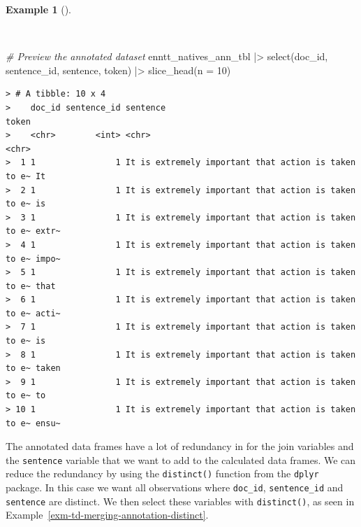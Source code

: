 \documentclass[
  letterpaper,
]{latex/krantz}
\newenvironment{Shaded}{\begin{snugshade}}{\end{snugshade}}
\newcommand{\AttributeTok}[1]{\textcolor[rgb]{0.00,0.00,0.00}{#1}}
\newcommand{\CommentTok}[1]{\textcolor[rgb]{0.00,0.00,0.00}{\textit{#1}}}
\newcommand{\DecValTok}[1]{\textcolor[rgb]{0.00,0.00,0.00}{#1}}
\newcommand{\FunctionTok}[1]{\textcolor[rgb]{0.00,0.00,0.00}{#1}}
\newcommand{\NormalTok}[1]{\textcolor[rgb]{0.00,0.00,0.00}{#1}}
\newcommand{\SpecialCharTok}[1]{\textcolor[rgb]{0.00,0.00,0.00}{#1}}
\theoremstyle{definition}
\newtheorem{example}{Example}[chapter]
\theoremstyle{remark}
\begin{document}
\begin{example}[]\protect\hypertarget{exm-td-merging-join-prepped-syn-comp-ann}{}\label{exm-td-merging-join-prepped-syn-comp-ann}

~

\begin{Shaded}
\begin{Highlighting}[]
\CommentTok{\# Preview the annotated dataset}
\NormalTok{enntt\_natives\_ann\_tbl }\SpecialCharTok{|\textgreater{}}
  \FunctionTok{select}\NormalTok{(doc\_id, sentence\_id, sentence, token) }\SpecialCharTok{|\textgreater{}}
  \FunctionTok{slice\_head}\NormalTok{(}\AttributeTok{n =} \DecValTok{10}\NormalTok{)}
\end{Highlighting}
\end{Shaded}

\begin{verbatim}
> # A tibble: 10 x 4
>    doc_id sentence_id sentence                                             token
>    <chr>        <int> <chr>                                                <chr>
>  1 1                1 It is extremely important that action is taken to e~ It   
>  2 1                1 It is extremely important that action is taken to e~ is   
>  3 1                1 It is extremely important that action is taken to e~ extr~
>  4 1                1 It is extremely important that action is taken to e~ impo~
>  5 1                1 It is extremely important that action is taken to e~ that 
>  6 1                1 It is extremely important that action is taken to e~ acti~
>  7 1                1 It is extremely important that action is taken to e~ is   
>  8 1                1 It is extremely important that action is taken to e~ taken
>  9 1                1 It is extremely important that action is taken to e~ to   
> 10 1                1 It is extremely important that action is taken to e~ ensu~
\end{verbatim}

\end{example}

The annotated data frames have a lot of redundancy in for the join
variables and the \texttt{sentence} variable that we want to add to the
calculated data frames. We can reduce the redundancy by using the
\texttt{distinct()} function from the \texttt{dplyr} package. In this
case we want all observations where \texttt{doc\_id},
\texttt{sentence\_id} and \texttt{sentence} are distinct. We then select
these variables with \texttt{distinct()}, as seen in
Example~\ref{exm-td-merging-annotation-distinct}.
\end{document}
